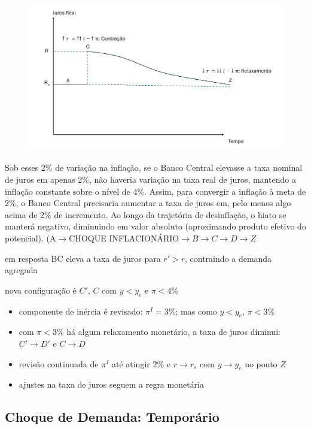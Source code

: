 \documentclass[a4paper,12pt]{article}[abntex2]
\begin{document}
\begin{figure}[H]
    \centering
    \includegraphics[width=0.7\linewidth]{Imagens/a13i4.png}
\end{figure}

Sob esses 2\% de variação na inflação, se o Banco Central elevasse a taxa nominal de juros em apenas 2\%, não haveria variação na taxa real de juros, mantendo a inflação constante sobre o nível de 4\%. Assim, para convergir a inflação à meta de 2\%, o Banco Central precisaria aumentar a taxa de juros em, pelo menos algo acima de 2\% de incremento. Ao longo da trajetória de desinflação, o hiato se manterá negativo, diminuindo em valor absoluto (aproximando produto efetivo do potencial). (A\(\rightarrow\)CHOQUE INFLACIONÁRIO\(\rightarrow B \rightarrow C \rightarrow D \rightarrow Z\) 

em resposta BC eleva a taxa de juros para \( r' > r \), contraindo a demanda agregada

nova configuração é \( C' \), \( C \) com \( y < y_e \) e \( \pi < 4\% \)

\begin{itemize}
    \item componente de inércia é revisado: \( \pi^I = 3\%\); mas como \( y < y_e \), \( \pi < 3\% \)
    \item com \( \pi < 3\% \) há algum relaxamento monetário, a taxa de juros diminui: \( C' \to D' \) e \( C \to D \)
    \item revisão continuada de \( \pi^I \) até atingir \( 2\% \) e \( r \to r_s \) com \( y \to y_e \) no ponto \( Z \)
    \item ajustes na taxa de juros seguem a regra monetária
\end{itemize}

\subsection{\textbf{Choque de Demanda: Temporário}}
\end{document}
